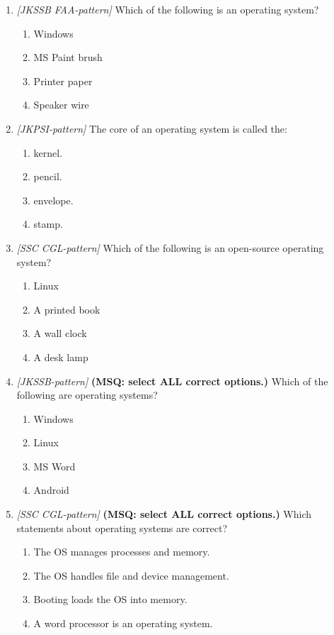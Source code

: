 \begin{enumerate}[label=\textbf{Q\arabic*.}, leftmargin=*]
\item \textit{[JKSSB FAA-pattern]} Which of the following is an operating system?
  \begin{enumerate}[label=\Alph*.]
    \item Windows
    \item MS Paint brush
    \item Printer paper
    \item Speaker wire
  \end{enumerate}
\item \textit{[JKPSI-pattern]} The core of an operating system is called the:
  \begin{enumerate}[label=\Alph*.]
    \item kernel.
    \item pencil.
    \item envelope.
    \item stamp.
  \end{enumerate}
\item \textit{[SSC CGL-pattern]} Which of the following is an open-source operating system?
  \begin{enumerate}[label=\Alph*.]
    \item Linux
    \item A printed book
    \item A wall clock
    \item A desk lamp
  \end{enumerate}
\item \textit{[JKSSB-pattern]} \textbf{(MSQ: select ALL correct options.)} Which of the following are operating systems?
  \begin{enumerate}[label=\Alph*.]
    \item Windows
    \item Linux
    \item MS Word
    \item Android
  \end{enumerate}
\item \textit{[SSC CGL-pattern]} \textbf{(MSQ: select ALL correct options.)} Which statements about operating systems are correct?
  \begin{enumerate}[label=\Alph*.]
    \item The OS manages processes and memory.
    \item The OS handles file and device management.
    \item Booting loads the OS into memory.
    \item A word processor is an operating system.

\end{enumerate}
\end{enumerate}
